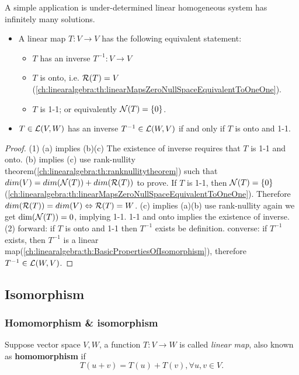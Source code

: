 \begin{refsection}
\begin{remark}
	A simple application is under-determined linear homogeneous system has infinitely many solutions.
\end{remark}

\begin{theorem}\label{ch:linearalgebra:th:existenceOfInverseLinearMaps}\cite[80]{axler2015linear}
\begin{itemize}
	\item A linear map $T: V\to V$ has the following equivalent statement:
	\begin{itemize}
		\item $T$ has an inverse $T^{-1}: V\to V$
		\item $T$ is onto, i.e. $\mathcal{R}(T) = V$(\autoref{ch:linearalgebra:th:linearMapsZeroNullSpaceEquivalentToOneOne}).
		\item $T$ is 1-1; or equivalently $\mathcal{N}(T) = \{0\}$.
	\end{itemize}
	\item 	
	$T\in \mathcal{L}(V,W)$ has an inverse $T^{-1}\in \mathcal{L}(W,V)$ if  and only if $T$ is onto and 1-1. 
\end{itemize}	
\end{theorem}
\begin{proof}
(1) (a) implies (b)(c)	The existence of inverse requires that $T$ is 1-1 and onto. (b) implies (c)
use rank-nullity theorem(\autoref{ch:linearalgebra:th:ranknullitytheorem}) such that $dim(V) = dim(\mathcal{N}(T)) + dim(\mathcal{R}(T))$ to prove. If $T$ is 1-1, then $\mathcal{N}(T) = \{0\}$(\autoref{ch:linearalgebra:th:linearMapsZeroNullSpaceEquivalentToOneOne}). Therefore $dim(\mathcal{R}(T)) = dim(V) \Leftrightarrow \mathcal{R}(T) = W$. (c) implies (a)(b) use rank-nullity again we get $\dim(\mathcal{N}(T)) = 0$, implying 1-1. 1-1 and onto implies the existence of inverse.
(2) forward: if $T$ is onto and 1-1 then $T^{-1}$ exists be definition. converse: if $T^{-1}$ exists, then $T^{-1}$ is a linear map(\autoref{ch:linearalgebra:th:BasicPropertiesOfIsomorphism}), therefore $T^{-1}\in \mathcal{L}(W,V)$.
\end{proof}



\subsection{Isomorphism}
\subsubsection{Homomorphism \& isomorphism}
\begin{definition}[homomorphism]
Suppose vector space $V, W$, a function $T:V\rightarrow W$ is called \emph{linear map}, also known as \textbf{homomorphism} if $$T(u+v) = T(u)+T(v), \forall u,v\in V.$$	
\end{definition}


\end{refsection}

